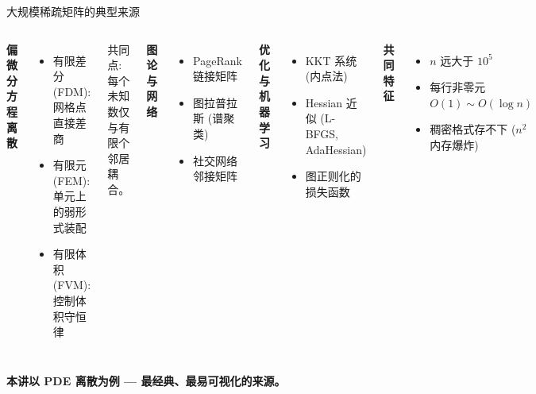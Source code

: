 \documentclass[12pt,aspectratio=169]{beamer}
\begin{document}
\begin{frame}[shrink]{大规模稀疏矩阵的典型来源}

\begin{columns}[T]
\textbf{偏微分方程离散}
\begin{itemize}
  \item 有限差分 (FDM): 网格点直接差商
  \item 有限元 (FEM): 单元上的弱形式装配
  \item 有限体积 (FVM): 控制体积守恒律
\end{itemize}
共同点: 每个未知数仅与有限个邻居耦合。

\vspace{4pt}
\textbf{图论与网络}
\begin{itemize}
  \item PageRank 链接矩阵
  \item 图拉普拉斯 (谱聚类)
  \item 社交网络邻接矩阵
\end{itemize}

\textbf{优化与机器学习}
\begin{itemize}
  \item KKT 系统 (内点法)
  \item Hessian 近似 (L-BFGS, AdaHessian)
  \item 图正则化的损失函数
\end{itemize}

\vspace{4pt}
\textbf{共同特征}
\begin{itemize}
  \item $n$ 远大于 $10^5$
  \item 每行非零元 $O(1) \sim O(\log n)$
  \item 稠密格式存不下 ($n^2$ 内存爆炸)
\end{itemize}
\end{columns}

\vspace{6pt}
\begin{center}
\textbf{本讲以 PDE 离散为例 — 最经典、最易可视化的来源。}
\end{center}
\end{frame}
\end{document}
